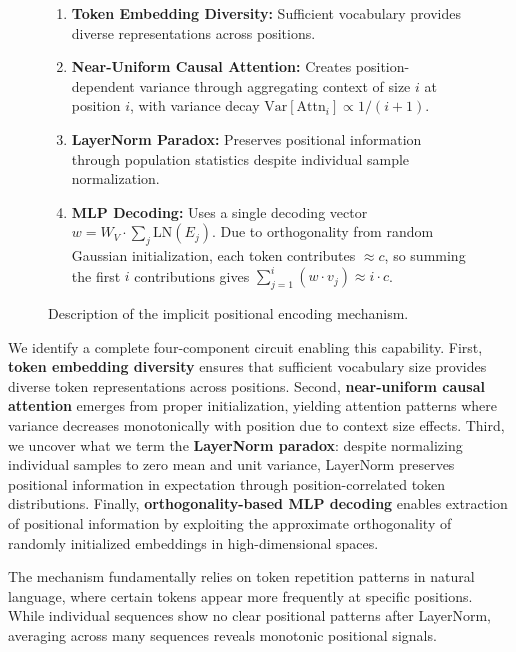 \documentclass[11pt]{article}
\begin{document}
\begin{figure}[H] 
\begin{tcolorbox}[
    title=The Implicit Positional Encoding Circuit, 
    width=\columnwidth, %
    left=2pt, right=2pt, %
    fonttitle=\bfseries
]
\begin{enumerate}
    \item \textbf{Token Embedding Diversity:} Sufficient vocabulary provides diverse representations across positions.
    \item \textbf{Near-Uniform Causal Attention:} Creates position-dependent variance through aggregating context of size $i$ at position $i$, with variance decay $\text{Var}[\text{Attn}_i] \propto 1/(i+1)$.
    \item \textbf{LayerNorm Paradox:} Preserves positional information through population statistics despite individual sample normalization.
    \item \textbf{MLP Decoding:} Uses a single decoding vector $w = W_V \cdot \sum_j \text{LN}(E_j)$. Due to orthogonality from random Gaussian initialization, each token contributes $\approx c$, so summing the first $i$ contributions gives $\sum_{j=1}^{i}(w \cdot v_j) \approx i \cdot c$.
\end{enumerate}
\end{tcolorbox}
\caption{Description of the implicit positional encoding mechanism.}
\label{fig:positional_encoding}
\end{figure}

We identify a complete four-component circuit enabling this capability. First, \textbf{token embedding diversity} ensures that sufficient vocabulary size provides diverse token representations across positions. Second, \textbf{near-uniform causal attention} emerges from proper initialization, yielding attention patterns where variance decreases monotonically with position due to context size effects. Third, we uncover what we term the \textbf{LayerNorm paradox}: despite normalizing individual samples to zero mean and unit variance, LayerNorm preserves positional information in expectation through position-correlated token distributions. Finally, \textbf{orthogonality-based MLP decoding} enables extraction of positional information by exploiting the approximate orthogonality of randomly initialized embeddings in high-dimensional spaces.

The mechanism fundamentally relies on token repetition patterns in natural language, where certain tokens appear more frequently at specific positions. While individual sequences show no clear positional patterns after LayerNorm, averaging across many sequences reveals monotonic positional signals.
\end{document}

